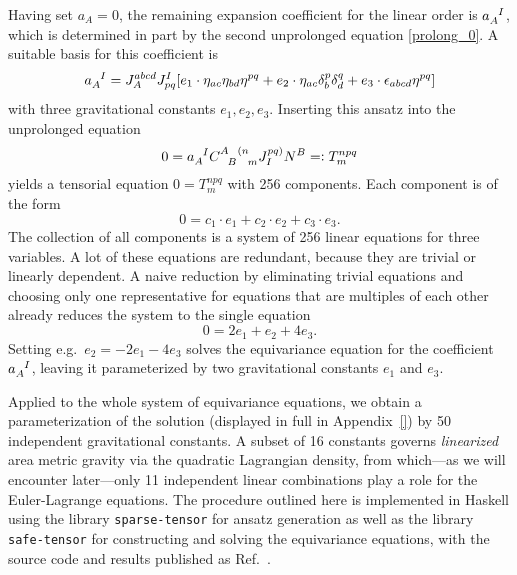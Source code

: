 \begin{example}
  Having set $a_A = 0$, the remaining expansion coefficient for the linear order is $a_A^{\hphantom AI}$, which is determined in part by the second unprolonged equation \eqref{prolong_0}. A suitable basis for this coefficient is
  \begin{equation}
    a_A^{\hphantom AI} = J_A^{abcd} J_{pq}^I\lbrack e_1 \cdot \eta_{ac} \eta_{bd} \eta^{pq} + e_2 \cdot \eta_{ac} \delta_b^p \delta_d^q + e_3 \cdot \epsilon_{abcd} \eta^{pq} \rbrack
  \end{equation}
  with three gravitational constants $e_1,e_2,e_3$. Inserting this ansatz into the unprolonged equation
  \begin{equation}
    0 = a_A^{\hphantom AI} \gmc{A}{B}{(n}{m} J^{pq)}_I N^B =\vcentcolon T^{npq}_m
  \end{equation}
  yields a tensorial equation $0 = T^{npq}_m$ with 256 components. Each component is of the form
  \begin{equation}
    0 = c_1\cdot e_1  + c_2\cdot e_2 + c_3\cdot e_3.
  \end{equation}
  The collection of all components is a system of 256 linear equations for three variables. A lot of these equations are redundant, because they are trivial or linearly dependent. A naive reduction by eliminating trivial equations and choosing only one representative for equations that are multiples of each other already reduces the system to the single equation
  \begin{equation}
    0 = 2 e_1 + e_2 + 4 e_3.
  \end{equation}
  Setting e.g.~$e_2 = -2 e_1 -4 e_3$ solves the equivariance equation for the coefficient $a_A^{\hphantom AI}$, leaving it parameterized by two gravitational constants $e_1$ and $e_3$.
\end{example}

Applied to the whole system of equivariance equations, we obtain a parameterization of the solution (displayed in full in Appendix~\ref{}) by 50 independent gravitational constants. A subset of 16 constants governs \emph{linearized} area metric gravity via the quadratic Lagrangian density, from which---as we will encounter later---only 11 independent linear combinations play a role for the Euler-Lagrange equations. The procedure outlined here is implemented in Haskell using the library \texttt{sparse-tensor} for ansatz generation as well as the library \texttt{safe-tensor} for constructing and solving the equivariance equations, with the source code and results published as Ref.~\cite{Alex_2020_area-metric-gravity}.

